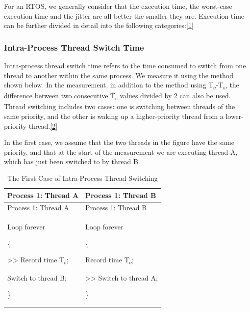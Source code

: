 For an RTOS, we generally consider that the execution time, the worst-case execution time and the jitter are all better the smaller they are. Execution time can be further divided in detail into the following categories:\hyperref[cite:1-1]{{[}1{]}}

\subsubsection{Intra-Process Thread Switch Time}\label{subsubsec:1-intra-process-thread-switch}

Intra-process thread switch time refers to the time consumed to switch from one thread to another within the same process. We measure it using the method shown below. In the measurement, in addition to the method using T\textsubscript{e}-T\textsubscript{s}, the difference between two consecutive T\textsubscript{s} values divided by 2 can also be used. Thread switching includes two cases: one is switching between threads of the same priority, and the other is waking up a higher-priority thread from a lower-priority thread.\hyperref[cite:1-2]{{[}2{]}}

In the first case, we assume that the two threads in the figure have the same priority, and that at the start of the measurement we are executing thread A, which has just been switched to by thread B.

\begin{xltabular}{\textwidth}{@{}>{\hsize\raggedright\arraybackslash}X>{\hsize\raggedright\arraybackslash}X@{}}
\caption{The First Case of Intra-Process Thread Switching}\label{tab:1-1-intra-process-thread-switch-case-1}\\
\toprule
Process 1: Thread A & Process 1: Thread B\tabularnewline
\endfirsthead
\toprule
Process 1: Thread A & Process 1: Thread B\tabularnewline
\midrule
\endhead
\bottomrule
\endlastfoot
Loop forever

\{

\textgreater\textgreater{} Record time T\textsubscript{s};

Switch to thread B;

\}\strut
 & Loop forever

\{

Record time T\textsubscript{e};

\textgreater\textgreater{} Switch to thread A;

\}\strut
\tabularnewline
\end{xltabular}
\nopagebreak[4]

